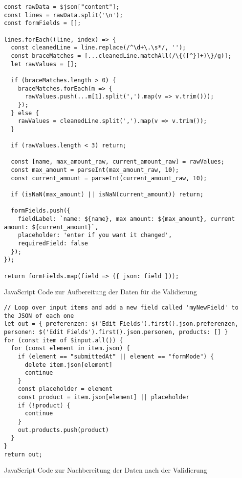 \begin{listing}
\begin{verbatim}
const rawData = $json["content"];
const lines = rawData.split('\n');
const formFields = [];

lines.forEach((line, index) => {
  const cleanedLine = line.replace(/^\d+\.\s*/, '');
  const braceMatches = [...cleanedLine.matchAll(/\{([^}]+)\}/g)];
  let rawValues = [];

  if (braceMatches.length > 0) {
    braceMatches.forEach(m => {
      rawValues.push(...m[1].split(',').map(v => v.trim()));
    });
  } else {
    rawValues = cleanedLine.split(',').map(v => v.trim());
  }

  if (rawValues.length < 3) return;

  const [name, max_amount_raw, current_amount_raw] = rawValues;
  const max_amount = parseInt(max_amount_raw, 10);
  const current_amount = parseInt(current_amount_raw, 10);

  if (isNaN(max_amount) || isNaN(current_amount)) return;

  formFields.push({
    fieldLabel: `name: ${name}, max amount: ${max_amount}, current amount: ${current_amount}`,
    placeholder: 'enter if you want it changed',
    requiredField: false
  });
});

return formFields.map(field => ({ json: field }));
\end{verbatim}
\caption{JavaScript Code zur Aufbereitung der Daten für die Validierung}
\label{lst:descr:js:code1}
\end{listing}

\begin{listing}
\begin{verbatim}
// Loop over input items and add a new field called 'myNewField' to the JSON of each one
let out = { preferenzen: $('Edit Fields').first().json.preferenzen, personen: $('Edit Fields').first().json.personen, products: [] }
for (const item of $input.all()) {
  for (const element in item.json) {
    if (element == "submittedAt" || element == "formMode") {
      delete item.json[element]
      continue
    }
    const placeholder = element
    const product = item.json[element] || placeholder
    if (!product) {
      continue
    }
    out.products.push(product)
  }
}
return out;
\end{verbatim}
\caption{JavaScript Code zur Nachbereitung der Daten nach der Validierung}
\label{lst:descr:js:code2}
\end{listing}

